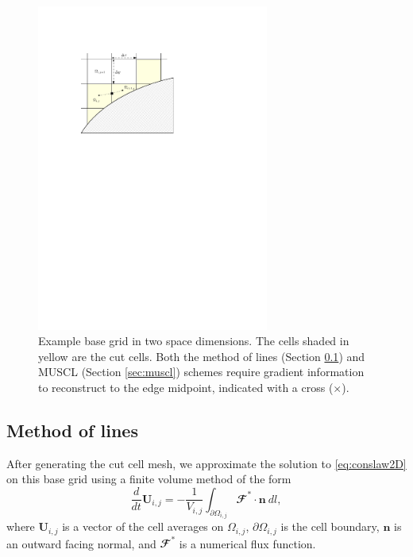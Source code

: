 \begin{figure}
\begin{center}
\includegraphics[width=3.0in]{figs/example_ccmesh.pdf}
\caption{\sf Example base grid in two space dimensions. The cells shaded in yellow are the cut cells.  Both the method of lines (Section \ref{sec:mol}) and MUSCL (Section \ref{sec:muscl}) schemes require gradient information to reconstruct to the edge midpoint, indicated with a cross ($\times$).} 
\label{fig:2dfig}
\end{center}
\end{figure}




\subsection{Method of lines} \label{sec:mol}

After generating the cut cell mesh, we approximate the solution to \eqref{eq:conslaw2D} on this base grid using a finite volume method of the form
\begin{equation}\label{eq:fvscheme}
\frac{d}{dt}\mathbf{U}_{i,j} =- \frac{1}{V_{i,j}} \int_{\partial \Omega_{i,j}} \mathbfcal{F} ^* \cdot \mathbf{n} ~dl,
\end{equation}
where $\mathbf{U}_{i,j}$ is a vector of the cell averages on $\Omega_{i,j}$, $\partial \Omega_{i,j}$ is the cell boundary, $\mathbf{n}$ is an outward facing normal, and $\mathbfcal{F}^*$ is a numerical flux function.

